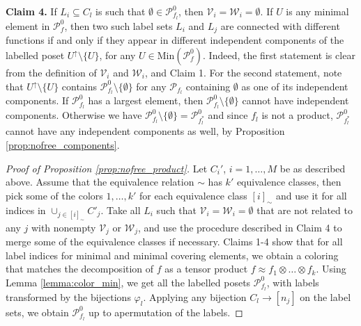 \documentclass[12pt]{article}
\theoremstyle{definition}
\theoremstyle{remark}
\def\Pe{\mathcal P}
\begin{document}
\medskip 
\noindent
\textbf{Claim 4.} If  $L_i\subseteq C_l$ is such that
 $\emptyset \in \Pe_{f_l}^0$, then  $\mathcal V_i=\mathcal W_i=\emptyset$. If
$U$ is any minimal element in $\Pe_f^0$, then two
such label sets $L_i$ and $L_j$ are connected with different functions  if and only if they appear
in different  independent components of the labelled poset $U^\uparrow\setminus \{U\}$,
for any $U\in \mathrm{Min}(\Pe_f^0)$.
Indeed, the first statement is clear from the definition of $\mathcal V_i$ and $\mathcal
W_i$, and Claim 1. For the second statement, note that $U^\uparrow\setminus \{U\}$
contains $\Pe_{f_l}^0\setminus\{\emptyset\}$ for any $\Pe_{f_l}$ containing $\emptyset$  as one of its independent
components. If $\Pe_{f_l}^0$ has a largest element, then $\Pe_{f_l}^0\setminus\{\emptyset\}$ cannot
have independent components. Otherwise we have $\Pe_{f_l}^0\setminus\{\emptyset\}=\Pe_{f_l^*}^0$ and since $f_l$ is not a product,
$\Pe_{f_l^*}^0$ cannot have any independent components as well, by Proposition
\ref{prop:nofree_components}. 

\begin{proof}[Proof of Proposition \ref{prop:nofree_product}] Let $C_i'$, $i=1,\dots,M$ be
as described above. Assume that the equivalence relation $\sim$ has $k'$ equivalence
classes, then pick some of the colors $1,\dots, k'$ for each equivalence class $[i]_\sim$ and use it
for all indices  in  $\cup_{j\in [i]_\sim} C'_j$. Take all $L_i$ such that  $\mathcal
V_i=\mathcal W_i=\emptyset$ that are not related to any $j$ with nonempty $\mathcal V_j$ or
$\mathcal W_j$,  and use the procedure described in Claim 4 to merge some of the equivalence
classes if necessary. Claims 1-4 show that for all label indices for minimal and minimal
covering elements, we obtain a coloring that matches the decomposition of $f$ as a tensor
product $f\approx f_1\otimes\dots\otimes f_k$. Using Lemma \ref{lemma:color_min}, we get
all the labelled posets $\Pe_{f_l}^0$, with labels transformed by the bijections
$\varphi_l$. Applying any bijection $C_l\to [n_j]$ on the label sets, we obtain
$\Pe_{f_l}^0$ up to apermutation of the labels.

\end{proof}
\end{document}
